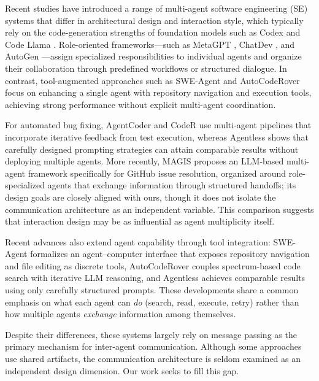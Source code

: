 \documentclass{ieeeaccess}
\begin{document}
Recent studies have introduced a range of multi-agent software engineering (SE) systems that differ in architectural design and interaction style, which typically rely on the code-generation strengths of foundation models such as Codex \cite{chen2021evaluating} and Code Llama \cite{roziere2023code}. Role-oriented frameworks---such as MetaGPT \cite{hong2024metagpt}, ChatDev \cite{qian2024chatdev}, and AutoGen \cite{wu2023autogen}---assign specialized responsibilities to individual agents and organize their collaboration through predefined workflows or structured dialogue. In contrast, tool-augmented approaches such as SWE-Agent \cite{yang2024sweagent} and AutoCodeRover \cite{zhang2024autocoderover} focus on enhancing a single agent with repository navigation and execution tools, achieving strong performance without explicit multi-agent coordination.

For automated bug fixing, AgentCoder \cite{huang2024agentcoder} and CodeR \cite{chen2024coder} use multi-agent pipelines that incorporate iterative feedback from test execution, whereas Agentless \cite{xia2024agentless} shows that carefully designed prompting strategies can attain comparable results without deploying multiple agents. More recently, MAGIS \cite{tao2024magis} proposes an LLM-based multi-agent framework specifically for GitHub issue resolution, organized around role-specialized agents that exchange information through structured handoffs; its design goals are closely aligned with ours, though it does not isolate the communication architecture as an independent variable. This comparison suggests that interaction design may be as influential as agent multiplicity itself.

Recent advances also extend agent capability through tool integration: SWE-Agent \cite{yang2024sweagent} formalizes an agent--computer interface that exposes repository navigation and file editing as discrete tools, AutoCodeRover \cite{zhang2024autocoderover} couples spectrum-based code search with iterative LLM reasoning, and Agentless \cite{xia2024agentless} achieves comparable results using only carefully structured prompts. These developments share a common emphasis on what each agent can \emph{do} (search, read, execute, retry) rather than how multiple agents \emph{exchange} information among themselves.

Despite their differences, these systems largely rely on message passing as the primary mechanism for inter-agent communication. Although some approaches use shared artifacts, the communication architecture is seldom examined as an independent design dimension. Our work seeks to fill this gap.
\end{document}
